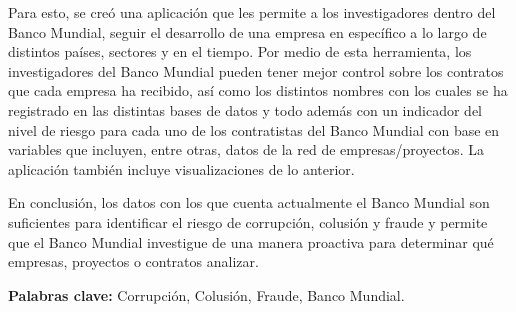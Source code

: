 Para esto, se creó una aplicación que les permite a los investigadores dentro del Banco Mundial, seguir el desarrollo de una empresa en específico a lo largo de distintos países, sectores y en el tiempo. Por medio de esta herramienta, los investigadores del Banco Mundial pueden tener mejor control sobre los contratos que cada empresa ha recibido, así como los distintos nombres con los cuales se ha registrado en las distintas bases de datos y todo además con  un indicador del nivel de riesgo para cada uno de los contratistas del Banco Mundial con base en variables que incluyen, entre otras, datos de la red de empresas/proyectos. La aplicación también incluye visualizaciones de lo anterior.

En conclusión, los datos con los que cuenta actualmente el Banco Mundial son suficientes para identificar el riesgo de corrupción, colusión y fraude y permite que el Banco Mundial investigue de una manera proactiva para determinar qué empresas, proyectos o contratos analizar.


\thispagestyle{plain}
\vfill
\scriptsize \noindent \textbf{Palabras clave:} Corrupción, Colusión, Fraude, Banco Mundial.
\normalsize